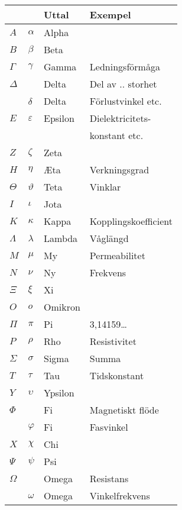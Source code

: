 \bigskip
  \begin{tabular}{ll|l|l}
        &    & Uttal & Exempel \\
    \hline
    \(A\) & \(\alpha\) & Alpha & \\
    \(B\) & \(\beta\) & Beta & \\
    \(\Gamma\) & \(\gamma\) & Gamma & Ledningsförmåga \\
    \(\Delta\) & & Delta & Del av .. storhet \\
    & \(\delta\) & Delta & Förlustvinkel etc. \\
    \(E\) & \(\varepsilon\) & Epsilon & Dielektricitets-\\
    & & & konstant etc.\\
    \(Z\) & \(\zeta\) & Zeta & \\
    \(H\) & \(\eta\) & \AE ta & Verkningsgrad\\
    \(\Theta\) & \(\vartheta\) & Teta & Vinklar \\
    \(I\) & \(\iota\) & Jota & \\
    \(K\) & \(\kappa\) & Kappa & Kopplingskoefficient \\
    \(\Lambda\) & \(\lambda\) & Lambda & Våglängd \\
    \(M\) & \(\mu\) & My & Permeabilitet \\
    \(N\) & \(\nu\) & Ny & Frekvens \\
    \(\Xi\) & \(\xi\) & Xi & \\
    \(O\) & \(o\) & Omikron & \\
    \(\Pi\) & \(\pi\) & Pi & 3,14159\dots \\
    \(P\) & \(\rho\) & Rho & Resistivitet \\
    \(\Sigma\) & \(\sigma\) & Sigma & Summa \\
    \(T\) & \(\tau\) & Tau & Tidskonstant \\
    \(Y\) & \(\upsilon\) & Ypsilon &  \\
    \(\Phi\) & & Fi & Magnetiskt flöde \\
    & \(\varphi\) & Fi & Fasvinkel \\
    \(X\) & \(\chi\) & Chi & \\
    \(\Psi\) & \(\psi\) & Psi & \\
    \(\Omega\) & & Omega & Resistans \\
    & \(\omega\) & Omega & Vinkelfrekvens \\
  \end{tabular}

